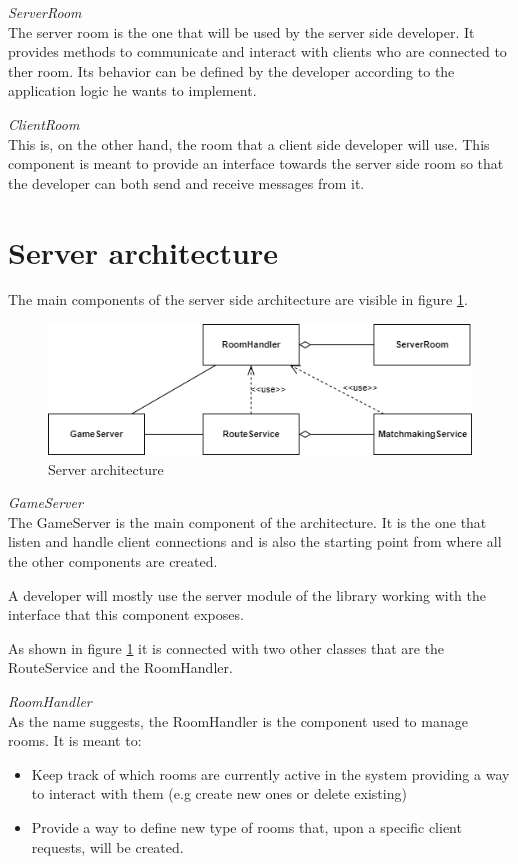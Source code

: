 \bigskip
\textit{ServerRoom}
\\
The server room is the one that will be used by the server side developer. It provides methods to communicate and interact with clients who are connected to ther room. Its behavior can be defined by the developer according to the application logic he wants to implement.

\bigskip
\textit{ClientRoom}
\\
This is, on the other hand, the room that a client side developer will use. This component is meant to provide an interface towards the server side room so that the developer can both send and receive messages from it.

\section{Server architecture}
The main components of the server side architecture are visible in figure \ref{fig:server_classes}. 

\begin{figure}[H]
	\includegraphics[scale=0.7]{images/3-architecture/server_architecture-classes.png}
	\caption{Server architecture}
	\label{fig:server_classes}
\end{figure}

\bigskip
\textit{GameServer}
\\
The GameServer is the main component of the architecture. It is the one that listen and handle client connections and is also the starting point from where all the other components are created.

A developer will mostly use the server module of the library working with the interface that this component exposes.

As shown in figure \ref{fig:server_classes} it is connected with two other classes that are the RouteService and the RoomHandler.

\bigskip
\textit{RoomHandler}
\\
As the name suggests, the RoomHandler is the component used to manage rooms. It is meant to: 
\begin{itemize}
	\item Keep track of which rooms are currently active in the system providing a way to interact with them (e.g create new ones or delete existing)
	\item Provide a way to define new type of rooms that, upon a specific client requests, will be created.
\end{itemize}

